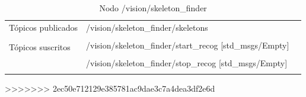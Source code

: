 \documentclass[12pt,twoside,final]{book}
\begin{document}
\begin{table}[H]
\begin{center}
\begin{tabular}{|l|p{6cm}|p{5cm}|}%
\hline

Tópicos publicados
& /vision/skeleton\_finder/skeletons  &  \\
& & \\
\hline

\multirow{2}{*}{Tópicos suscritos}
& /vision/skeleton\_finder/start\_recog [std\_msgs/Empty] &  \\
& & \\
& /vision/skeleton\_finder/stop\_recog [std\_msgs/Empty] &  \\
& & \\
\cline{1-3}
 
\end{tabular}
\caption{Nodo /vision/skeleton\_finder}
\label{skeleton finder node}
\end{center}
\end{table}



































>>>>>>> 2ec50e712129e385781ac9dae3c7a4dea3df2e6d

\tableofcontents





\appendix



\end{document}
